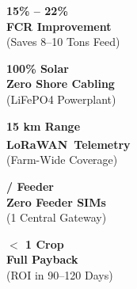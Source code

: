 \documentclass[10pt,a4paper]{article}
\begin{document}
\begin{tcolorbox}[
  enhanced,
  colback=PageBg,
  colframe=BorderLight,
  arc=2mm,
  boxrule=0.8pt,
  left=4pt, right=4pt, top=8pt, bottom=8pt
]
  \begin{minipage}[t]{0.19\linewidth}
    \centering
    {\fontsize{14.5}{17}\selectfont \textbf{\textcolor{EmeraldGreen}{15\% -- 22\%}}}\\[3pt]
    {\fontsize{7.5}{9.5}\selectfont \textbf{FCR Improvement}\\(Saves 8--10 Tons Feed)}
  \end{minipage}\hfill
  \begin{minipage}[t]{0.19\linewidth}
    \centering
    {\fontsize{14.5}{17}\selectfont \textbf{\textcolor{TealPrimary}{100\% Solar}}}\\[3pt]
    {\fontsize{7.5}{9.5}\selectfont \textbf{Zero Shore Cabling}\\(LiFePO4 Powerplant)}
  \end{minipage}\hfill
  \begin{minipage}[t]{0.19\linewidth}
    \centering
    {\fontsize{14.5}{17}\selectfont \textbf{\textcolor{NavyPrimary}{15 km Range}}}\\[3pt]
    {\fontsize{7.5}{9.5}\selectfont \textbf{LoRaWAN\textsuperscript{\tiny \textregistered}\ Telemetry}\\(Farm-Wide Coverage)}
  \end{minipage}\hfill
  \begin{minipage}[t]{0.19\linewidth}
    \centering
    {\fontsize{14.5}{17}\selectfont \textbf{\textcolor{EmeraldGreen}{ / Feeder}}}\\[3pt]
    {\fontsize{7.5}{9.5}\selectfont \textbf{Zero Feeder SIMs}\\(1 Central Gateway)}
  \end{minipage}\hfill
  \begin{minipage}[t]{0.19\linewidth}
    \centering
    {\fontsize{14.5}{17}\selectfont \textbf{\textcolor{AmberDark}{$<$ 1 Crop}}}\\[3pt]
    {\fontsize{7.5}{9.5}\selectfont \textbf{Full Payback}\\(ROI in 90--120 Days)}
  \end{minipage}
\end{tcolorbox}

\vspace{5pt}
\end{document}
